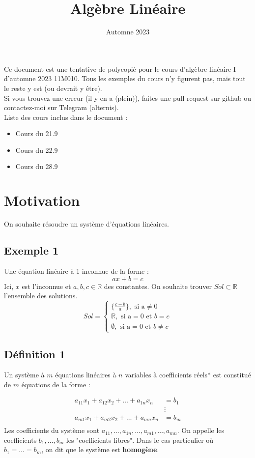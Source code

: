 \documentclass[12pt]{article}
\title{Algèbre Linéaire}
\date{Automne 2023}
\begin{document}
\maketitle

\newcommand{\R}{\mathbb{R}}
\newcommand{\K}{\mathrm{K}}
\newcommand{\C}{\mathbb{C}}
\newcommand{\zero}{\mathbb{0}}
\newcommand{\family}{\{v_i\}_{i\in I}}
\newcommand{\uv}{\{u,v\}}

Ce document est une tentative de polycopié pour le cours d'algèbre 
linéaire I d'automne 2023 11M010. Tous les exemples du cours n'y figurent pas, mais tout le reste y est (ou devrait y être).
\\
Si vous trouvez une erreur (il y en a (plein)), faites une pull request sur github ou contactez-moi sur Telegram (alternis).
\\
Liste des cours inclus dans le document :
\begin{itemize}
    \item Cours du 21.9
    \item Cours du 22.9
    \item Cours du 28.9
\end{itemize}
\pagebreak
\tableofcontents
\pagebreak

\section*{Motivation}
On souhaite résoudre un système d'équations linéaires.
\subsection*{Exemple 1}
Une équation linéaire à 1 inconnue de la forme :
$$
ax+b=c
$$
Ici, $x$ est l'inconnue et $a,b,c \in \R$ des constantes. On souhaite trouver $Sol \subset \R$
l'ensemble des solutions.
$$
Sol = \begin{cases} \{\frac{c-b}{a}\}, \text{ si a} \neq 0 \\
     \R, \text{ si a}=0 \text{ et } b = c \\ 
    \emptyset, \text{ si a}=0 \text{ et } b \neq c
    \end{cases}
$$
\subsection*{Définition 1}
Un système à $m$ équations linéaires à $n$ variables à 
coefficients réels* est constitué de $m$ équations de la forme :

$$
\begin{aligned}
    a_{11}x_1 + a_{12}x_2 + \dots + a_{1n}x_n &=b_1 \\
    & \vdots \\
    a_{m1}x_1 + a_{m2}x_2 + \dots + a_{mn}x_n &=b_m \\
\end{aligned}
$$
Les coefficients du système sont $a_{11}, \dots, a_{1n}, \dots, a_{m1}, \dots, a_{mn}$.
On appelle les coefficients $b_1, \dots, b_m$ les "coefficients libres".
Dans le cas particulier où $b_1 = \dots = b_m$, on dit que le système est \textbf{homogène}.
\end{document}
